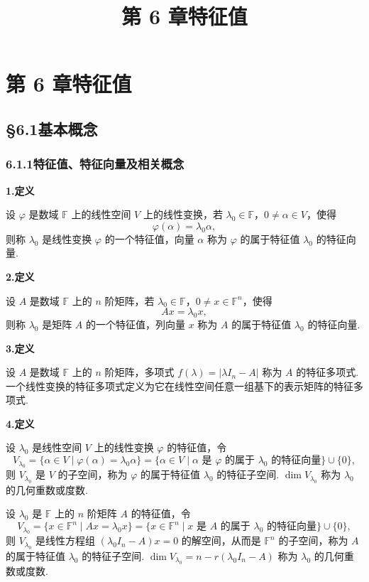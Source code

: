 \documentclass[UTF8, 12pt, fontset=fandol, oneside]{ctexart}
\title{第 6 章\quad 特征值}
\author{}
\date{}
\begin{document}
\maketitle

\section*{第 6 章\quad 特征值}

\subsection*{§6.1\quad 基本概念}

\subsubsection*{6.1.1\quad 特征值、特征向量及相关概念}

\noindent\textbf{1.\quad 定义}

设 $\varphi$ 是数域 $\mathbb{F}$ 上的线性空间 $V$ 上的线性变换，若 $\lambda_0\in\mathbb{F}$，$0\ne \alpha\in V$，使得
\[
\varphi(\alpha)=\lambda_0\alpha,
\]
则称 $\lambda_0$ 是线性变换 $\varphi$ 的一个特征值，向量 $\alpha$ 称为 $\varphi$ 的属于特征值 $\lambda_0$ 的特征向量.

\noindent\textbf{2.\quad 定义}

设 $A$ 是数域 $\mathbb{F}$ 上的 $n$ 阶矩阵，若 $\lambda_0\in\mathbb{F}$，$0\ne x\in\mathbb{F}^n$，使得
\[
Ax=\lambda_0x,
\]
则称 $\lambda_0$ 是矩阵 $A$ 的一个特征值，列向量 $x$ 称为 $A$ 的属于特征值 $\lambda_0$ 的特征向量.

\noindent\textbf{3.\quad 定义}

设 $A$ 是数域 $\mathbb{F}$ 上的 $n$ 阶矩阵，多项式 $f(\lambda)=|\lambda I_n-A|$ 称为 $A$ 的特征多项式. 一个线性变换的特征多项式定义为它在线性空间任意一组基下的表示矩阵的特征多项式.

\noindent\textbf{4.\quad 定义}

设 $\lambda_0$ 是线性空间 $V$ 上的线性变换 $\varphi$ 的特征值，令
\[
V_{\lambda_0}=\{\alpha\in V\mid \varphi(\alpha)=\lambda_0\alpha\}
=\{\alpha\in V\mid \alpha\text{ 是 }\varphi\text{ 的属于 }\lambda_0\text{ 的特征向量}\}\cup\{0\},
\]
则 $V_{\lambda_0}$ 是 $V$ 的子空间，称为 $\varphi$ 的属于特征值 $\lambda_0$ 的特征子空间. $\dim V_{\lambda_0}$ 称为 $\lambda_0$ 的几何重数或度数.

设 $\lambda_0$ 是 $\mathbb{F}$ 上的 $n$ 阶矩阵 $A$ 的特征值，令
\[
V_{\lambda_0}=\{x\in\mathbb{F}^n\mid Ax=\lambda_0x\}
=\{x\in\mathbb{F}^n\mid x\text{ 是 }A\text{ 的属于 }\lambda_0\text{ 的特征向量}\}\cup\{0\},
\]
则 $V_{\lambda_0}$ 是线性方程组 $(\lambda_0I_n-A)x=0$ 的解空间，从而是 $\mathbb{F}^n$ 的子空间，称为 $A$ 的属于特征值 $\lambda_0$ 的特征子空间. $\dim V_{\lambda_0}=n-r(\lambda_0I_n-A)$ 称为 $\lambda_0$ 的几何重数或度数.
\end{document}
